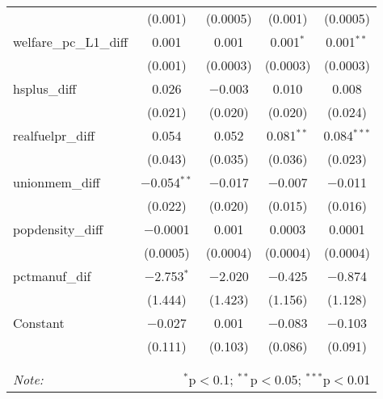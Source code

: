 \begin{table}[!htbp]
\begin{tabular}{@{\extracolsep{5pt}}lcccc}
  & (0.001) & (0.0005) & (0.001) & (0.0005) \\ 
  welfare\_pc\_L1\_diff & 0.001 & 0.001 & 0.001$^{*}$ & 0.001$^{**}$ \\ 
  & (0.001) & (0.0003) & (0.0003) & (0.0003) \\ 
  hsplus\_diff & 0.026 & $-$0.003 & 0.010 & 0.008 \\ 
  & (0.021) & (0.020) & (0.020) & (0.024) \\ 
  realfuelpr\_diff & 0.054 & 0.052 & 0.081$^{**}$ & 0.084$^{***}$ \\ 
  & (0.043) & (0.035) & (0.036) & (0.023) \\ 
  unionmem\_diff & $-$0.054$^{**}$ & $-$0.017 & $-$0.007 & $-$0.011 \\ 
  & (0.022) & (0.020) & (0.015) & (0.016) \\ 
  popdensity\_diff & $-$0.0001 & 0.001 & 0.0003 & 0.0001 \\ 
  & (0.0005) & (0.0004) & (0.0004) & (0.0004) \\ 
  pctmanuf\_dif & $-$2.753$^{*}$ & $-$2.020 & $-$0.425 & $-$0.874 \\ 
  & (1.444) & (1.423) & (1.156) & (1.128) \\ 
  Constant & $-$0.027 & 0.001 & $-$0.083 & $-$0.103 \\ 
  & (0.111) & (0.103) & (0.086) & (0.091) \\ 
 \hline \\[-1.8ex] 
\hline 
\hline \\[-1.8ex] 
\textit{Note:}  & \multicolumn{4}{r}{$^{*}$p$<$0.1; $^{**}$p$<$0.05; $^{***}$p$<$0.01} \\ 
\end{tabular} 
\end{table} 
